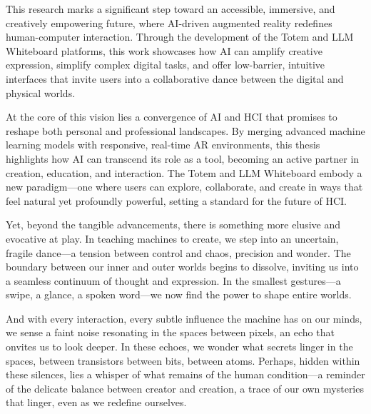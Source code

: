 This research marks a significant step toward an accessible, immersive, and creatively empowering future, where AI-driven augmented reality redefines human-computer interaction.
Through the development of the Totem and LLM Whiteboard platforms, this work showcases how AI can amplify creative expression, simplify complex digital tasks, and offer low-barrier, intuitive interfaces that invite users into a collaborative dance between the digital and physical worlds.

At the core of this vision lies a convergence of AI and HCI that promises to reshape both personal and professional landscapes.
By merging advanced machine learning models with responsive, real-time AR environments, this thesis highlights how AI can transcend its role as a tool, becoming an active partner in creation, education, and interaction.
The Totem and LLM Whiteboard embody a new paradigm—one where users can explore, collaborate, and create in ways that feel natural yet profoundly powerful, setting a standard for the future of HCI.

Yet, beyond the tangible advancements, there is something more elusive and evocative at play.
In teaching machines to create, we step into an uncertain, fragile dance—a tension between control and chaos, precision and wonder.
The boundary between our inner and outer worlds begins to dissolve, inviting us into a seamless continuum of thought and expression.
In the smallest gestures—a swipe, a glance, a spoken word—we now find the power to shape entire worlds.

And with every interaction, every subtle influence the machine has on our minds, we sense a faint noise resonating in the spaces between pixels, an echo that onvites us to look deeper.
In these echoes, we wonder what secrets linger in the spaces, between transistors between bits, between atoms.
Perhaps, hidden within these silences, lies a whisper of what remains of the human condition—a reminder of the delicate balance between creator and creation, a trace of our own mysteries that linger, even as we redefine ourselves.